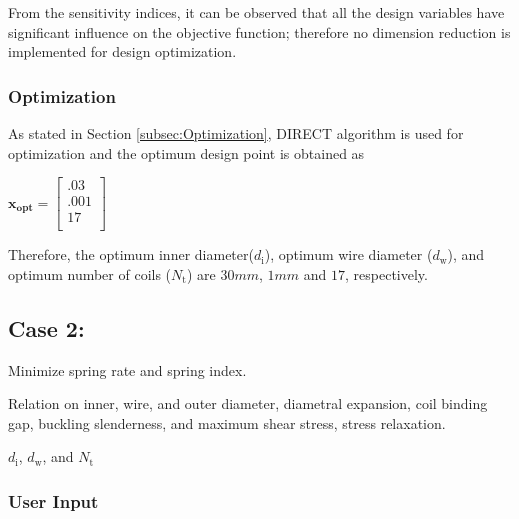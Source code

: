 \documentclass[10pt]{article}
\begin{document}
From the sensitivity indices, it can be observed that all the design variables have significant influence on the objective function; therefore no dimension reduction is implemented for design optimization. 

	\subsubsection{Optimization}
	
	As stated in Section \ref{subsec:Optimization}, DIRECT algorithm is used for optimization and the optimum design point is obtained as 
	\begin{center}
	$\mathbf{x_{opt}} =
	\left[
	\begin{array}{c}
	 	 .03 \\
	 	 .001 \\
		 17    \\ 
		
	 \end{array}
	 \right]
$	
\end{center}
    Therefore, the optimum inner diameter($d_{\text{i}}$), optimum wire diameter ($d_{\text{w}}$), and optimum number of coils ($N_{\text{t}}$) are $30 mm$, $1 mm$ and $17$, respectively.
		
\newpage

\subsection{Case 2:}
\label{subsec:Case2}

\vspace{-.1in}
\begin{description}[leftmargin=!,labelwidth=\widthof{\bfseries Design Variables:}, labelindent = 1cm]
	\item[Objectives:] Minimize spring rate and spring index.\\
	\item[Constraints:] Relation on inner, wire, and outer diameter, diametral expansion, coil binding gap, buckling slenderness, and maximum shear stress, stress relaxation. \\
	\item[Design Variables:] $d_{\text{i}}$, $d_{\text{w}}$, and $N_{\text{t}}$ \\
\end{description}

	\subsubsection{User Input}
	
\end{document}
